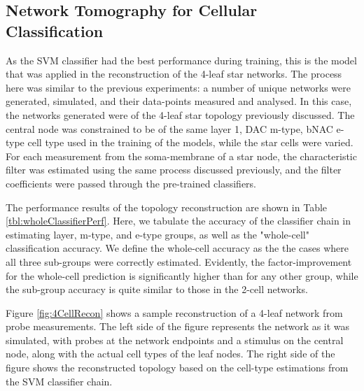 \documentclass[letterpaper, 10 pt, conference]{ieeeconf}  %
\begin{document}
\subsection*{Network Tomography for Cellular Classification}

As the SVM classifier had the best performance during training, this is the model that was applied in the reconstruction of the 4-leaf star networks. The process here was similar to the previous experiments: a number of unique networks were generated, simulated, and their data-points measured and analysed. In this case, the networks generated were of the 4-leaf star topology previously discussed. The central node was constrained to be of the same layer 1, DAC m-type, bNAC e-type cell type used in the training of the models, while the star cells were varied. For each measurement from the soma-membrane of a star node, the characteristic filter was estimated using the same process discussed previously, and the filter coefficients were passed through the pre-trained classifiers.

\par
The performance results of the topology reconstruction are shown in Table \ref{tbl:wholeClassifierPerf}. Here, we tabulate the accuracy of the classifier chain in estimating layer, m-type, and e-type groups, as well as the "whole-cell" classification accuracy. We define the whole-cell accuracy as the the cases where all three sub-groups were correctly estimated. Evidently, the factor-improvement for the whole-cell prediction is significantly higher than for any other group, while the sub-group accuracy is quite similar to those in the 2-cell networks.

\par

Figure \ref{fig:4CellRecon} shows a sample reconstruction of a 4-leaf network from probe measurements. The left side of the figure represents the network as it was simulated, with probes at the network endpoints and a stimulus on the central node, along with the actual cell types of the leaf nodes. The right side of the figure shows the reconstructed topology based on the cell-type estimations from the SVM classifier chain. 
\end{document}
